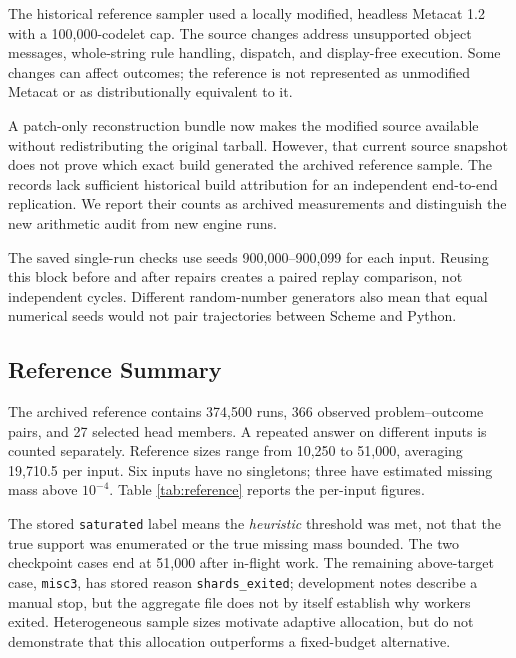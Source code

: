 \documentclass[10pt,letterpaper]{article}
\begin{document}
The historical reference sampler used a locally modified, headless Metacat 1.2 with a
100,000-codelet cap. The source changes address unsupported object messages, whole-string
rule handling, dispatch, and display-free execution. Some changes can affect outcomes; the
reference is not represented as unmodified Metacat or as distributionally equivalent to
it.

A patch-only reconstruction bundle now makes the modified source available without
redistributing the original tarball. However, that current source snapshot does not prove
which exact build generated the archived reference sample. The records lack sufficient
historical build attribution for an independent end-to-end replication. We report their
counts as archived measurements and distinguish the new arithmetic audit from new engine
runs.

The saved single-run checks use seeds 900,000--900,099 for each input. Reusing this block
before and after repairs creates a paired replay comparison, not independent cycles.
Different random-number generators also mean that equal numerical seeds would not pair
trajectories between Scheme and Python.

\subsection{Reference Summary}\label{sec:reference-results}

The archived reference contains 374,500 runs, 366 observed problem--outcome pairs, and 27
selected head members. A repeated answer on different inputs is counted separately.
Reference sizes range from 10,250 to 51,000, averaging 19,710.5 per input. Six inputs have
no singletons; three have estimated missing mass above \(10^{-4}\). Table
\ref{tab:reference} reports the per-input figures.



The stored \texttt{saturated} label means the \emph{heuristic} threshold was met, not that
the true support was enumerated or the true missing mass bounded. The two checkpoint cases
end at 51,000 after in-flight work. The remaining above-target case, \texttt{misc3}, has
stored reason \texttt{shards\_exited}; development notes describe a manual stop, but the
aggregate file does not by itself establish why workers exited. Heterogeneous sample sizes
motivate adaptive allocation, but do not demonstrate that this allocation outperforms a
fixed-budget alternative.
\end{document}
